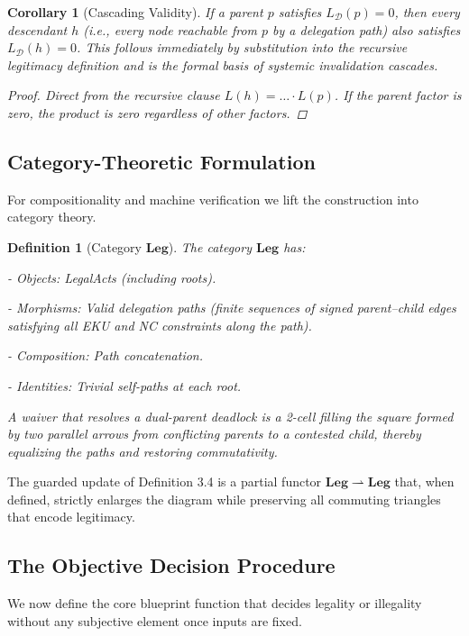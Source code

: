 \documentclass[11pt,a4paper]{article}
\newtheorem{definition}[theorem]{Definition}
\newtheorem{corollary}[theorem]{Corollary}
\begin{document}
\begin{corollary}[Cascading Validity]
If a parent \(p\) satisfies \(L_{\mathcal{D}}(p) = 0\), then every descendant \(h\) (i.e., every node reachable from \(p\) by a delegation path) also satisfies \(L_{\mathcal{D}}(h) = 0\). This follows immediately by substitution into the recursive legitimacy definition and is the formal basis of systemic invalidation cascades.

\begin{proof}
Direct from the recursive clause \(L(h) = \dots \cdot L(p)\). If the parent factor is zero, the product is zero regardless of other factors.
\end{proof}
\end{corollary}

\subsection{Category-Theoretic Formulation}

For compositionality and machine verification we lift the construction into category theory.

\begin{definition}[Category \(\mathbf{Leg}\)]
The category \(\mathbf{Leg}\) has:

- Objects: LegalActs (including roots).

- Morphisms: Valid delegation paths (finite sequences of signed parent--child edges satisfying all EKU and NC constraints along the path).

- Composition: Path concatenation.

- Identities: Trivial self-paths at each root.

A waiver that resolves a dual-parent deadlock is a 2-cell filling the square formed by two parallel arrows from conflicting parents to a contested child, thereby equalizing the paths and restoring commutativity.
\end{definition}

The guarded update of Definition 3.4 is a partial functor \(\mathbf{Leg} \rightharpoonup \mathbf{Leg}\) that, when defined, strictly enlarges the diagram while preserving all commuting triangles that encode legitimacy.

\subsection{The Objective Decision Procedure}

We now define the core blueprint function that decides legality or illegality without any subjective element once inputs are fixed.
\end{document}
